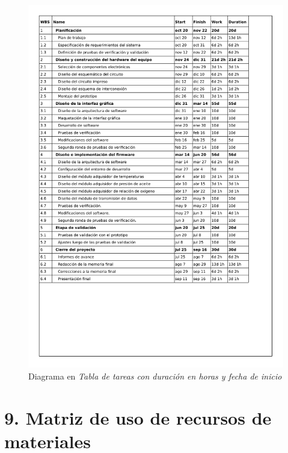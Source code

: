 \documentclass[11pt]{charter}
\begin{document}
\begin{figure}[htpb]
\centering 
\includegraphics[width=.9\textwidth]{./Figuras/tabla-gantt.pdf}
\caption{Diagrama en \textit{Tabla de tareas con duración en horas y fecha de inicio}}
\label{fig:tabla-gantt}
\end{figure}




\section{9. Matriz de uso de recursos de materiales}
\label{sec:recursos}
\end{document}

